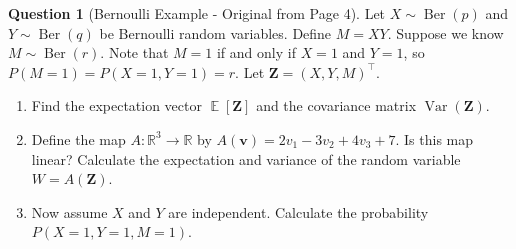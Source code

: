 \documentclass[11pt, a4paper]{article}
\DeclareMathOperator{\E}{\mathbb{E}}             %
\DeclareMathOperator{\Var}{\mathrm{Var}}         %
\theoremstyle{definition}
\newtheorem{question}[theorem]{Question} %
\theoremstyle{remark}
\newcommand{\RR}{\mathbb{R}}             %
\newcommand{\vect}[1]{\bm{#1}}          %
\newcommand{\transpose}{^{\top}}        %
\begin{document}
\begin{question}[Bernoulli Example - Original from Page 4]
Let $X \sim \operatorname{Ber}(p)$ and $Y \sim \operatorname{Ber}(q)$ be Bernoulli random variables. Define $M = XY$. Suppose we know $M \sim \operatorname{Ber}(r)$. Note that $M=1$ if and only if $X=1$ and $Y=1$, so $P(M=1) = P(X=1, Y=1) = r$.
Let $\vect{Z} = (X, Y, M)\transpose$.
\begin{enumerate}[label=(\alph*)]
    \item Find the expectation vector $\E[\vect{Z}]$ and the covariance matrix $\Var(\vect{Z})$.
    \item Define the map $A: \RR^3 \to \RR$ by $A(\vect{v}) = 2v_1 - 3v_2 + 4v_3 + 7$. Is this map linear? Calculate the expectation and variance of the random variable $W = A(\vect{Z})$.
    \item Now assume $X$ and $Y$ are independent. Calculate the probability $P(X=1, Y=1, M=1)$.
\end{enumerate}
\end{question}
\end{document}
